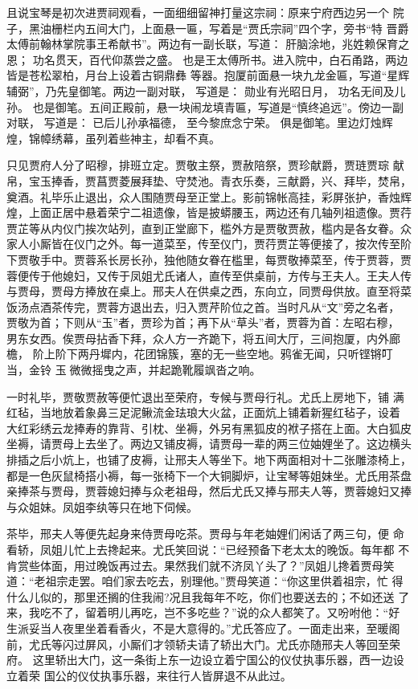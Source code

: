 且说宝琴是初次进贾祠观看，一面细细留神打量这宗祠：原来宁府西边另一个
院子，黑油栅栏内五间大门，上面悬一匾，写着是“贾氏宗祠”四个字，旁书“特
晋爵太傅前翰林掌院事王希献书”。两边有一副长联，写道：
肝脑涂地，兆姓赖保育之恩；
功名贯天，百代仰蒸尝之盛。
也是王太傅所书。进入院中，白石甬路，两边皆是苍松翠柏，月台上设着古铜鼎彝
等器。抱厦前面悬一块九龙金匾，写道“星辉辅弼”，乃先皇御笔。两边一副对联，
写道是：
勋业有光昭日月，
功名无间及儿孙。
也是御笔。五间正殿前，悬一块闹龙填青匾，写道是“慎终追远”。傍边一副对联，
写道是：
已后儿孙承福德，
至今黎庶念宁荣。
俱是御笔。里边灯烛辉煌，锦幛绣幕，虽列着些神主，却看不真。

只见贾府人分了昭穆，排班立定。贾敬主祭，贾赦陪祭，贾珍献爵，贾琏贾琮
献帛，宝玉捧香，贾菖贾菱展拜垫、守焚池。青衣乐奏，三献爵，兴、拜毕，焚帛，
奠酒。礼毕乐止退出，众人围随贾母至正堂上。影前锦帐高挂，彩屏张护，香烛辉
煌，上面正居中悬着荣宁二祖遗像，皆是披蟒腰玉，两边还有几轴列祖遗像。贾荇
贾芷等从内仪门挨次站列，直到正堂廊下，槛外方是贾敬贾赦，槛内是各女眷。众
家人小厮皆在仪门之外。每一道菜至，传至仪门，贾荇贾芷等便接了，按次传至阶
下贾敬手中。贾蓉系长房长孙，独他随女眷在槛里，每贾敬捧菜至，传于贾蓉，贾
蓉便传于他媳妇，又传于凤姐尤氏诸人，直传至供桌前，方传与王夫人。王夫人传
与贾母，贾母方捧放在桌上。邢夫人在供桌之西，东向立，同贾母供放。直至将菜
饭汤点酒茶传完，贾蓉方退出去，归入贾芹阶位之首。当时凡从“文”旁之名者，
贾敬为首；下则从“玉”者，贾珍为首；再下从“草头”者，贾蓉为首：左昭右穆，
男东女西。俟贾母拈香下拜，众人方一齐跪下，将五间大厅，三间抱厦，内外廊檐，
阶上阶下两丹墀内，花团锦簇，塞的无一些空地。鸦雀无闻，只听铿锵叮当，金铃
玉微微摇曳之声，并起跪靴履飒沓之响。

一时礼毕，贾敬贾赦等便忙退出至荣府，专候与贾母行礼。尤氏上房地下，铺
满红毡，当地放着象鼻三足泥鳅流金珐琅大火盆，正面炕上铺着新猩红毡子，设着
大红彩绣云龙捧寿的靠背、引枕、坐褥，外另有黑狐皮的袱子搭在上面。大白狐皮
坐褥，请贾母上去坐了。两边又铺皮褥，请贾母一辈的两三位妯娌坐了。这边横头
排插之后小炕上，也铺了皮褥，让邢夫人等坐下。地下两面相对十二张雕漆椅上，
都是一色灰鼠椅搭小褥，每一张椅下一个大铜脚炉，让宝琴等姐妹坐。尤氏用茶盘
亲捧茶与贾母，贾蓉媳妇捧与众老祖母，然后尤氏又捧与邢夫人等，贾蓉媳妇又捧
与众姐妹。凤姐李纨等只在地下伺候。

茶毕，邢夫人等便先起身来侍贾母吃茶。贾母与年老妯娌们闲话了两三句，便
命看轿，凤姐儿忙上去搀起来。尤氏笑回说：“已经预备下老太太的晚饭。每年都
不肯赏些体面，用过晚饭再过去。果然我们就不济凤丫头了？”凤姐儿搀着贾母笑
道：“老祖宗走罢。咱们家去吃去，别理他。”贾母笑道：“你这里供着祖宗，忙
得什么儿似的，那里还搁的住我闹?况且我每年不吃，你们也要送去的；不如还送
了来，我吃不了，留着明儿再吃，岂不多吃些？”说的众人都笑了。又吩咐他：“好
生派妥当人夜里坐着看香火，不是大意得的。”尤氏答应了。一面走出来，至暖阁
前，尤氏等闪过屏风，小厮们才领轿夫请了轿出大门。尤氏亦随邢夫人等回至荣府。
这里轿出大门，这一条街上东一边设立着宁国公的仪仗执事乐器，西一边设立着荣
国公的仪仗执事乐器，来往行人皆屏退不从此过。

